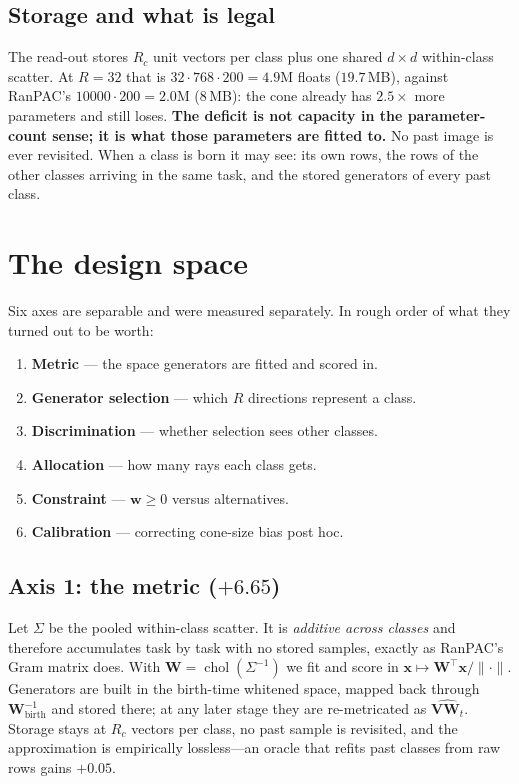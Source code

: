 \documentclass[10pt,twocolumn]{article}
\newcommand{\bx}{\mathbf{x}}
\newcommand{\bw}{\mathbf{w}}
\newcommand{\bV}{\mathbf{V}}
\newcommand{\bW}{\mathbf{W}}
\begin{document}
\subsection{Storage and what is legal}
The read-out stores $R_c$ unit vectors per class plus one shared $d\times d$
within-class scatter. At $R{=}32$ that is $32\cdot768\cdot200=4.9$M floats
($19.7$\,MB), against RanPAC's $10000\cdot200=2.0$M ($8$\,MB): the cone already
has $2.5\times$ more parameters and still loses. \textbf{The deficit is not
capacity in the parameter-count sense; it is what those parameters are fitted
to.} No past image is ever revisited. When a class is born it may see: its own
rows, the rows of the other classes arriving in the same task, and the stored
generators of every past class.

\section{The design space}

Six axes are separable and were measured separately. In rough order of what
they turned out to be worth:
\begin{enumerate}\itemsep1pt
\item \textbf{Metric} --- the space generators are fitted and scored in.
\item \textbf{Generator selection} --- which $R$ directions represent a class.
\item \textbf{Discrimination} --- whether selection sees other classes.
\item \textbf{Allocation} --- how many rays each class gets.
\item \textbf{Constraint} --- $\bw\ge0$ versus alternatives.
\item \textbf{Calibration} --- correcting cone-size bias post hoc.
\end{enumerate}

\subsection{Axis 1: the metric ($+6.65$)}
Let $\Sigma$ be the pooled within-class scatter. It is \emph{additive across
classes} and therefore accumulates task by task with no stored samples, exactly
as RanPAC's Gram matrix does. With $\bW=\operatorname{chol}(\Sigma^{-1})$ we fit
and score in $\bx\mapsto\bW^{\!\top}\bx/\lVert\cdot\rVert$. Generators are built
in the birth-time whitened space, mapped back through $\bW_{\text{birth}}^{-1}$
and stored there; at any later stage they are re-metricated as
$\widehat{\bV\bW_t}$. Storage stays at $R_c$ vectors per class, no past sample
is revisited, and the approximation is empirically lossless---an oracle that
refits past classes from raw rows gains $+0.05$.
\end{document}
